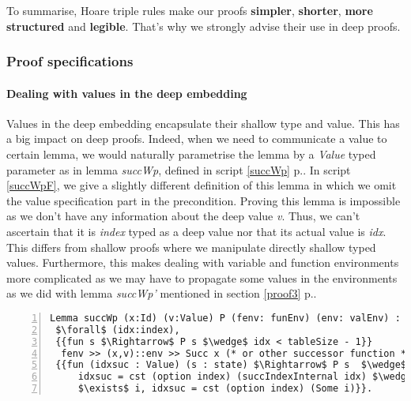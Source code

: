 To summarise, Hoare triple rules make our proofs \textbf{simpler}, \textbf{shorter}, \textbf{more structured} and \textbf{legible}. That's why we strongly advise their use in deep proofs. \pagebreak

\subsubsection{Proof specifications}
\paragraph{Dealing with values in the deep embedding}
Values in the deep embedding encapsulate their shallow type and value. This has a big impact on deep proofs. Indeed, when we need to communicate a value to certain lemma, we would naturally parametrise the lemma by a \textit{Value} typed parameter as in lemma \textit{succWp}, defined in script \ref{succWp} p.\pageref{succWp}. In script \ref{succWpF}, we give a slightly different definition of this lemma in which we omit the value specification part in the precondition. Proving this lemma is impossible as we don't have any information about the deep value \textit{v}. Thus, we can't ascertain that it is \textit{index} typed as a deep value nor that its actual value is \textit{idx}. This differs from shallow proofs where we manipulate directly shallow typed values. Furthermore, this makes dealing with variable and function environments more complicated as we may have to propagate some values in the environments as we did with lemma \textit{succWp'} mentioned in section \ref{proof3} p.\pageref{proof3}.
\begin{lstlisting}[caption = {succWp false lemma definition},numbers=left, xleftmargin=-.06\textwidth,
xrightmargin=-.06\textwidth, mathescape=true,label={succWpF}]
Lemma succWp (x:Id) (v:Value) P (fenv: funEnv) (env: valEnv) :
 $\forall$ (idx:index), 
 {{fun s $\Rightarrow$ P s $\wedge$ idx < tableSize - 1}} 
  fenv >> (x,v)::env >> Succ x (* or other successor function *) 
 {{fun (idxsuc : Value) (s : state) $\Rightarrow$ P s  $\wedge$
	 idxsuc = cst (option index) (succIndexInternal idx) $\wedge$
	 $\exists$ i, idxsuc = cst (option index) (Some i)}}.
\end{lstlisting} \vspace{4pt}

